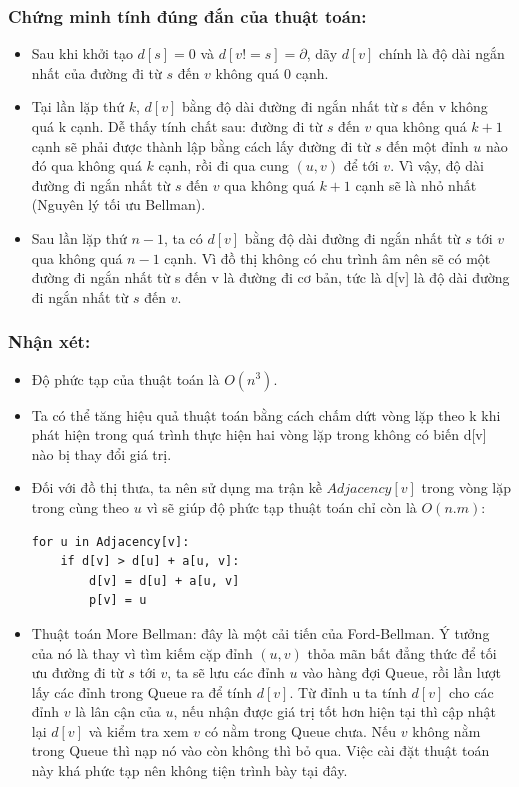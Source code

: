 \documentclass[a4paper,12pt]{report}
\begin{document}
    \subsubsection{Chứng minh tính đúng đắn của thuật toán:}
\begin{itemize}

	\item Sau khi khởi tạo $ d[s] = 0 $ và $ d[v != s] = \partial $, dãy $ d[v] $ chính là độ dài ngắn nhất của đường đi từ $s$ đến $v$ không quá $0$ cạnh.
	\item Tại lần lặp thứ $k$, $d[v]$ bằng độ dài đường đi ngắn nhất từ s đến v không quá k cạnh. Dễ thấy tính chất sau: đường đi từ $s$ đến $v$ qua không quá $ k + 1 $ cạnh sẽ phải được thành lập bằng cách lấy đường đi từ $s$ đến một đỉnh $u$ nào đó qua không quá $k$ cạnh, rồi đi qua cung $ (u, v) $ để tới $ v $. Vì vậy, độ dài đường đi ngắn nhất từ $s$ đến $v$ qua không quá $ k+1 $ cạnh sẽ là nhỏ nhất (Nguyên lý tối ưu Bellman).
	\item Sau lần lặp thứ $ n-1 $, ta có $ d[v] $  bằng độ dài đường đi ngắn nhất từ $s$ tới $v$ qua không quá $ n-1 $ cạnh. Vì đồ thị không có chu trình âm nên sẽ có một đường đi ngắn nhất từ s đến v là đường đi cơ bản, tức là d[v] là độ dài đường đi ngắn nhất từ $s$ đến $v$.

\end{itemize}
    \subsubsection{Nhận xét:}
\begin{itemize}

	\item Độ phức tạp của thuật toán là $ O(n^{3}) $.
	\item Ta có thể tăng hiệu quả thuật toán bằng cách chấm dứt vòng lặp theo k khi phát hiện trong quá trình thực hiện hai vòng lặp trong không có biến d[v] nào bị thay đổi giá trị.
	\item Đối với đồ thị thưa, ta nên sử dụng ma trận kề $ Adjacency[v] $ trong vòng lặp trong cùng theo $u$ vì sẽ giúp độ phức tạp thuật toán chỉ còn là $ O(n.m) $:\\
\begin{verbatim}		
for u in Adjacency[v]:
    if d[v] > d[u] + a[u, v]:
        d[v] = d[u] + a[u, v]
        p[v] = u
\end{verbatim}
	\item Thuật toán More Bellman: đây là một cải tiến của Ford-Bellman. Ý tưởng của nó là thay vì tìm kiếm cặp đỉnh $ (u, v) $ thỏa mãn bất đẳng thức để tối ưu đường đi từ $s$ tới $v$, ta sẽ lưu các đỉnh $u$ vào hàng đợi Queue, rồi lần lượt lấy các đỉnh trong Queue ra để tính $ d[v] $. Từ đỉnh u ta tính $ d[v] $ cho các đỉnh $ v $ là lân cận của $ u $, nếu nhận được giá trị tốt hơn hiện tại thì cập nhật lại $ d[v] $ và kiểm tra xem $ v $ có nằm trong Queue chưa. Nếu $ v $ không nằm trong Queue thì nạp nó vào còn không thì bỏ qua. Việc cài đặt thuật toán này khá phức tạp nên không tiện trình bày tại đây.

\end{itemize}
\end{document}
